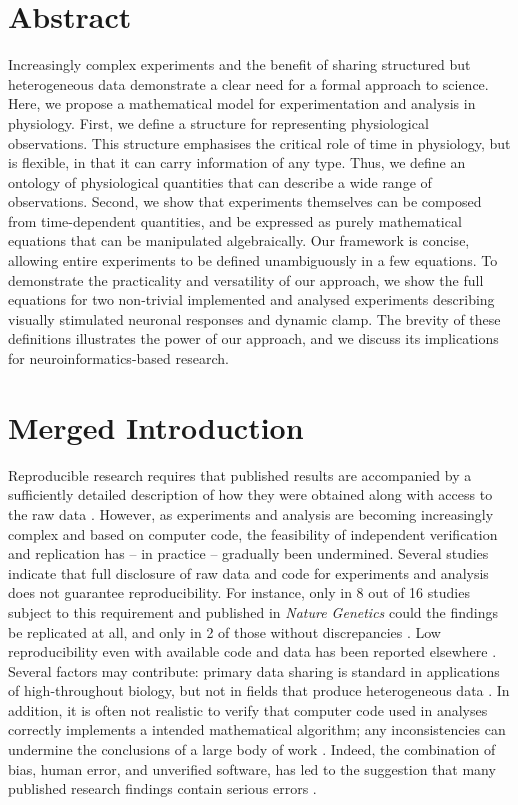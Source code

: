 
\section*{Abstract}

Increasingly complex experiments and the benefit of sharing structured
but heterogeneous data demonstrate a clear need for a formal approach
to science.  Here, we propose a mathematical model for
experimentation and analysis in physiology. First, we define a
structure for representing physiological observations. This structure
emphasises the critical role of time in physiology, but is flexible,
in that it can carry information of any type. Thus, we define an
ontology of physiological quantities that can describe a wide range of
observations. Second, we show that experiments themselves can be
composed from time-dependent quantities, and be expressed as purely
mathematical equations that can be manipulated algebraically. Our
framework is concise, allowing entire experiments to be defined
unambiguously in a few equations. To demonstrate the practicality and
versatility of our approach, we show the full equations for two
non-trivial implemented and analysed experiments describing visually
stimulated neuronal responses and dynamic clamp. The brevity of these
definitions illustrates the power of our approach, and we discuss its
implications for neuroinformatics-based research.

\pagebreak

\section*{Merged Introduction}

Reproducible research requires that published results are accompanied
by a sufficiently detailed description of how they were obtained along
with access to the raw data \citep{Fomel2009}. However, as experiments
and analysis are becoming increasingly complex and based on computer
code, the feasibility of independent verification and replication has
-- in practice -- gradually been undermined. Several studies indicate
that full disclosure of raw data and code for experiments and analysis
does not guarantee reproducibility.  For instance, only in 8 out of 16
studies subject to this requirement and published in \emph{Nature
  Genetics} could the findings be replicated at all, and only in 2 of
those without discrepancies \citep{Ioannidis2008}. Low reproducibility
even with available code and data has been reported elsewhere
\citep{Baggerly2009, McCullough2007}. Several factors may contribute:
primary data sharing is standard in applications of high-throughout
biology, but not in fields that produce heterogeneous data
\citep{Gardner2005}. In addition, it is often not realistic to verify
that computer code used in analyses correctly implements a intended
mathematical algorithm; any inconsistencies can undermine the
conclusions of a large body of work \citep{Chang2006}. Indeed, the
combination of bias, human error, and unverified software, has led to
the suggestion that many published research findings contain serious
errors \citep{Ioannidis2005, Merali2010}.

